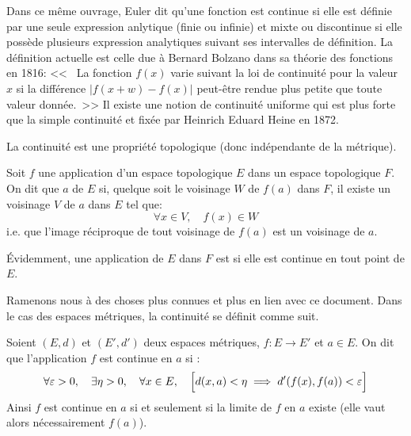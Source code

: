 \begin{histoire}
Dans ce même ouvrage, Euler
dit qu'une fonction est continue si elle est définie par une seule expression anlytique
(finie ou infinie) et mixte ou discontinue si elle possède plusieurs expression analytiques
suivant ses intervalles de définition.
\medskip
La définition actuelle est celle due à Bernard Bolzano
 dans sa théorie des
fonctions en 1816: <<~ La fonction $f(x)$ varie suivant la loi de continuité pour la valeur $x$
si la différence $| f(x + w) -f(x) |$ peut-être rendue plus petite que toute valeur donnée.~>>
Il existe une notion de continuité uniforme qui est plus forte que la simple continuité
et fixée par Heinrich Eduard Heine
 en 1872.
\end{histoire}


\medskip
La continuité est une propriété topologique (donc indépendante de la métrique).

\medskip
\begin{definition}
Soit $f$ une application d'un espace topologique $E$ dans un espace topologique
$F$.
On dit que  $a$ de $E$ si, quelque
soit le voisinage $W$ de $f(a)$ dans $F$, il existe un voisinage $V$ de $a$ dans $E$
tel que:
\begin{equation}
\forall x\in V, \quad f(x)\in W
\end{equation}
i.e. que l'image réciproque de tout voisinage de $f(a)$ est un voisinage de $a$.
\end{definition}


\medskip
Évidemment, une  application de $E$ dans $F$ est  si
elle est continue en tout point de $E$.

\medskip
Ramenons nous à des choses plus connues et plus en lien avec ce document.
Dans le cas des espaces métriques, la continuité se définit comme suit.

\begin{definition}
Soient $(E,d)$ et $(E',d')$ deux espaces métriques, $f : E \to E'$ et $a \in E$.
On dit que l'application $f$ est continue en $a$ si :
\begin{equation}
    \forall \varepsilon > 0, \quad \exists \eta > 0, \quad \forall x \in E, \quad \Bigl[d(x,a)<\eta \implies d'(f(x),f(a))<\varepsilon\Bigr]
\end{equation}
Ainsi $f$ est continue en $a$ si et seulement si la limite de $f$ en $a$ existe
(elle vaut alors nécessairement $f(a)$).
\end{definition}

